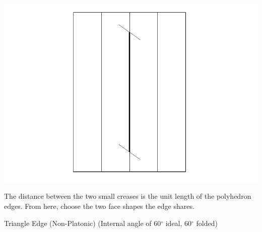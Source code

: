 \documentclass[11pt]{article}
\begin{document}
\vspace*{0.125in}

\begin{minipage}[t]{0.45\textwidth}
  \includegraphics[width=\textwidth]{../figs/fig3}
  \begin{itemize}{\item[3.] The distance between the two small creases is the unit length of the polyhedron edges.  From here, choose the two face shapes the edge shares.}\end{itemize}
\end{minipage}

\newpage
{\Large Triangle Edge} (Non-Platonic) (Internal angle of 60$^\circ$ ideal, 60$^\circ$ folded)
\vspace*{0.25in}
\end{document}
